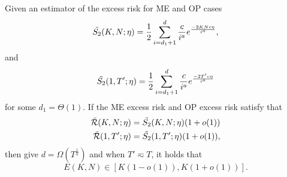 \begin{lemma} \label{lem:E_K}
    Given an estimator of the excess risk for ME and OP cases
    \begin{align*}
        \Tilde{S_2}(K,N;\eta) = \frac{1}{2}\sum_{i=d_1+1}^{d}\frac{c}{i^{a}}e^{\frac{-2KNc\eta}{i^{a}}},
    \end{align*}
    and
    \begin{align*}
        \Tilde{S_2}(1,T';\eta)=\frac{1}{2}\sum_{i=d_1+1}^{d}\frac{c}{i^{a}}e^{\frac{-2T'c\eta}{i^{a}}}
    \end{align*}
    for some $d_1 = \Theta(1)$. If the ME excess risk and OP excess risk satisfy that
    \begin{align*}
        \Bar{\mathcal{R}}(K,N;\eta) &= \Tilde{S_2}(K,N;\eta)(1+o(1)) \\
        \Bar{\mathcal{R}}(1,T';\eta) &= \Tilde{S_2}(1,T';\eta)(1+o(1)),
    \end{align*}
    then give $d = \Omega(T^{\frac{1}{a}})$ and when $T' \eqsim T$, it holds that 
    \[E(K, N) \in \left[K(1-o(1)),K(1+o(1))\right].\]
\end{lemma}
